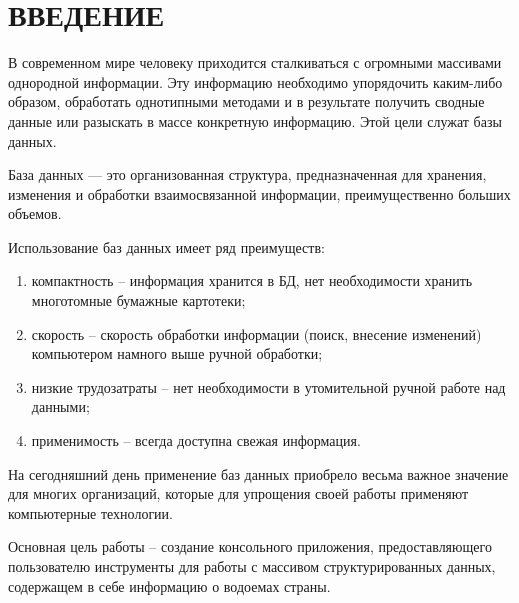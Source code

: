 \newpage

\section*{ВВЕДЕНИЕ} %
{} %

В современном мире человеку приходится сталкиваться с огромными массивами однородной информации. Эту информацию необходимо упорядочить каким-либо образом, обработать однотипными методами и в результате получить сводные данные или разыскать в массе конкретную информацию. Этой цели служат базы данных.

База данных — это организованная структура, предназначенная для хранения, изменения и обработки взаимосвязанной информации, преимущественно больших объемов.

Использование баз данных имеет ряд преимуществ:

\begin{enumerate}
    \item компактность – информация хранится в БД, нет необходимости хранить многотомные бумажные картотеки;
    \item скорость – скорость обработки информации (поиск, внесение изменений) компьютером намного выше ручной обработки;
    \item низкие трудозатраты – нет необходимости в утомительной ручной работе над данными;
    \item применимость – всегда доступна свежая информация.
\end{enumerate}

На сегодняшний день применение баз данных приобрело весьма важное значение для многих организаций, которые для упрощения своей работы применяют компьютерные технологии.

Основная цель работы – создание консольного приложения, предоставляющего пользователю инструменты для работы с массивом структурированных данных, содержащем в себе информацию о водоемах страны.

\newpage